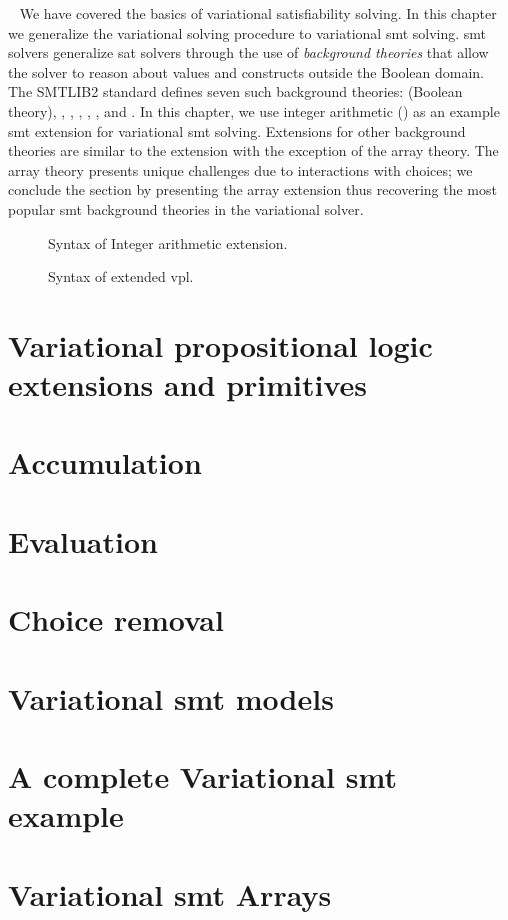 ~\label{chapter:vsmt}
%
We have covered the basics of variational satisfiability solving. In this
chapter we generalize the variational solving procedure to variational \ac{smt}
solving.
\ac{smt} solvers generalize \ac{sat} solvers through the use of \emph{background
  theories} that allow the solver to reason about values and constructs outside
the Boolean domain. The SMTLIB2 standard defines seven such background theories:
 (Boolean theory), , ,
, , , and . In this chapter,
we use integer arithmetic () as an example \ac{smt} extension for
variational \ac{smt} solving. Extensions for other background theories are
similar to the  extension with the exception of the array theory. The
array theory presents unique challenges due to interactions with choices; we
conclude the section by presenting the array extension thus recovering the most
popular \ac{smt} background theories in the variational solver.
\begin{figure}
  \centering
  
  \caption{Syntax of Integer arithmetic extension.}%
  \label{fig:arith:stx}
\end{figure}
%
\begin{figure}

\centering
\caption{Syntax of extended \ac{vpl}.}%
\label{fig:arith:vpl}
\end{figure}
%
\section{Variational propositional logic extensions and primitives}
%

\section{Accumulation}
%

\section{Evaluation}
%

\section{Choice removal}
%

\section{Variational \ac{smt} models}
%

\section{A complete Variational \ac{smt} example}


\section{Variational \ac{smt} Arrays}


